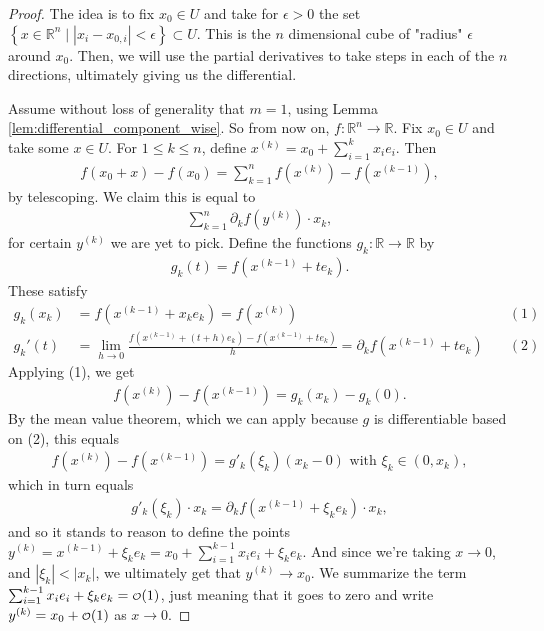 \begin{proof}
	The idea is to fix $x_{0} \in U$ and take for $\epsilon > 0$ the set $\left\{ x \in \mathbb{R}^{n} \mid \left| x_{i} - x_{0,i} \right| < \epsilon \right\} \subset U$. This is the $n$ dimensional cube of "radius" $\epsilon$ around $x_{0}$. Then, we will use the partial derivatives to take steps in each of the $n$ directions, ultimately giving us the differential.

	Assume without loss of generality that $m = 1$, using Lemma \ref{lem:differential_component_wise}. So from now on, $f: \mathbb{R}^{n} \to \mathbb{R}$.
	Fix $x_{0} \in U$ and take some $x \in U$. For $1 \leq k \leq n$, define $x^{(k)} = x_{0} + \sum_{i=1}^{k} x_{i}e_{i}$. Then
	\begin{align*}
		f(x_{0} + x) - f(x_{0}) = \sum_{k=1}^{n} f(x^{(k)}) - f(x^{(k-1)}),
	\end{align*}
	by telescoping. We claim this is equal to
	\begin{align*}
		\sum_{k=1}^{n} \partial_{k} f(y^{(k)}) \cdot x_{k},
	\end{align*}
	for certain $y^{(k)}$ we are yet to pick. Define the functions $g_{k}: \mathbb{R} \to \mathbb{R}$ by
	\begin{align*}
		g_{k}(t) = f(x^{(k-1)}+te_{k}).
	\end{align*}
	These satisfy
	\begin{align*}
		g_{k}(x_{k}) &= f(x^{(k-1)}+x_{k}e_{k}) = f(x^{(k)}) \quad  &(1)\\  g_{k}'(t) &= \lim_{h \to 0} \frac{f(x^{(k-1)} + (t+h)e_{k}) - f(x^{(k-1)} + te_{k})}{h} = \partial_{k}f(x^{(k-1)} + te_{k}) \quad &(2)
	\end{align*}
	Applying (1), we get
	\begin{align*}
		f(x^{(k)}) - f(x^{(k-1)}) = g_{k}(x_{k}) - g_{k}(0).
	\end{align*}
	By the mean value theorem, which we can apply because $g$ is differentiable based on (2), this equals
	\begin{align*}
		f(x^{(k)}) - f(x^{(k-1)}) = g'_{k}(\xi_{k})(x_{k} - 0) \text{ with } \xi_{k} \in (0, x_{k}),
	\end{align*}
	which in turn equals
	\begin{align*}
		g'_{k}(\xi_{k})\cdot x_{k} = \partial_{k}f(x^{(k-1)}+\xi_{k}e_{k})\cdot x_{k},
	\end{align*}
	and so it stands to reason to define the points $y^{(k)} = x^{(k-1)}+\xi_{k}e_{k} = x_{0} + \sum_{i=1}^{k-1} x_{i}e_{i} + \xi_{k}e_{k}$. And since we're taking $x \to 0$, and $\left| \xi_{k} \right| < \left| x_{k} \right|$, we ultimately get that $y^{(k)} \to x_{0}$.
	We summarize the term $\sum_{i=1}^{k-1} x_{i}e_{i} + \xi_{k}e_{k} = \smalO( 1 )$, just meaning that it goes to zero and write $y^{(k)} = x_{0} + \smalO( 1 )$ as $x \to 0$.


\end{proof}
